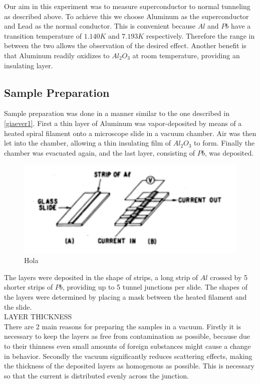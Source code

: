 
Our aim in this experiment was to measure superconductor to normal tunneling as described above. To achieve this we choose Aluminum as the superconductor and Lead as the normal conductor. This is convenient because $Al$ and $Pb$ have a transition temperature of $1.140 K$ and $7.193 K$ respectively. Therefore the range in between the two allows the observation of the desired effect. Another benefit is that Aluminum readily oxidizes to $Al_2O_3$ at room temperature, providing an insulating layer.\\

\subsection{Sample Preparation}
Sample preparation was done in a manner similar to the one described in \ref{giaever1}. First a thin layer of Aluminum was vapor-deposited by means of a heated spiral filament onto a microscope slide in a vacuum chamber. Air was then let into the chamber, allowing a thin insulating film of $Al_2O_3$ to form. Finally the chamber was evacuated again, and the last layer, consisting of $Pb$, was deposited.\\

\begin{figure}
\centering
\includegraphics[scale=1]{sample.pdf}
\caption{Hola\label{sample}}
\end{figure}


The layers were deposited in the shape of strips, a long strip of $Al$ crossed by 5 shorter strips of $Pb$, providing up to 5 tunnel junctions per slide. The shapes of the layers were determined by placing a mask between the heated filament and the slide.\\

LAYER THICKNESS\\

There are 2 main reasons for preparing the samples in a vacuum. Firstly it is necessary to keep the layers as free from contamination as possible, because due to their thinness even small amounts of foreign substances might cause a change in behavior. Secondly the vacuum significantly reduces scattering effects, making the thickness of the deposited layers as homogenous as possible. This is necessary so that the current is distributed evenly across the junction.\\

